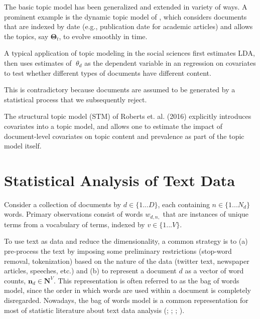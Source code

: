 \documentclass[12pt,a4paper,notitlepage]{article}
\begin{document}
The basic topic model has been generalized and extended in variety of ways. A prominent example is the dynamic topic model of \citet{blei_dynamic_2006}, which considers documents that are indexed by date (e.g., publication date for academic articles) and allows the topics, say $\boldsymbol{\Theta}_t$, to evolve smoothly in time. 

A typical application of topic modeling in the social sciences first estimates LDA, then uses estimates of $\theta_d$ as the dependent variable in an regression on covariates to test whether different types of documents have different content. 

This is contradictory because documents are assumed to be generated by a statistical process that we subsequently reject.

The structural topic model (STM) of Roberts et. al. (2016) explicitly introduces covariates into a topic model, and allows one to estimate the impact of document-level covariates on topic content and prevalence as part of the topic model itself.

\section{Statistical Analysis of Text Data}

Consider a collection of documents by $d \in \lbrace 1 ... D \rbrace$, each containing $n \in \lbrace 1 ... N_d \rbrace$ words. Primary observations consist of words $w_{d,n,}$ that are instances of unique terms from a vocabulary of terms, indexed by $v \in \lbrace 1 ... V \rbrace$. 

To use text as data and reduce the dimensionality, a common strategy is to (a) pre-process the text by imposing some preliminary restrictions (stop-word removal, tokenization) based on the nature of the data (twitter text, newspaper articles, speeches, etc.) and (b) to represent a document $d$ as a vector of word counts, $\boldsymbol{n}_d \in \boldsymbol{N}^V$. This representation is often referred to as the bag of words model, since the order in which words are used within a document is completely disregarded. Nowadays, the bag of words model is a common representation for most of statistic literature about text data analysis (\citet{blei_latent_2003}; \citet{erosheva_mixed-membership_2004}; \citet{griffiths_finding_2004}; \citet{genkin_large-scale_2007}).
\end{document}
